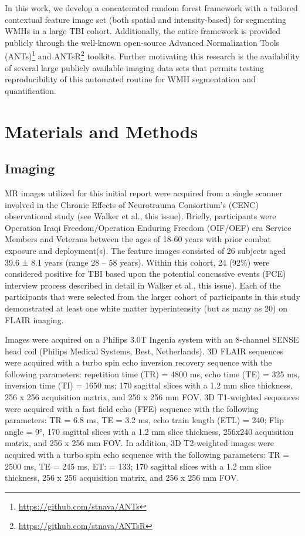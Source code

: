 \documentclass[11pt,]{article}
\let\rmarkdownfootnote\footnote%
\def\footnote{\protect\rmarkdownfootnote}
\begin{document}
In this work, we develop a concatenated random forest framework with a
tailored contextual feature image set (both spatial and intensity-based)
for segmenting WMHs in a large TBI cohort. Additionally, the entire
framework is provided publicly through the well-known open-source
Advanced Normalization Tools (ANTs)\footnote{\url{https://github.com/stnava/ANTs}}
and ANTsR\footnote{\url{https://github.com/stnava/ANTsR}} toolkits.
Further motivating this research is the availability of several large
publicly available imaging data sets that permits testing
reproducibility of this automated routine for WMH segmentation and
quantification.

\section{Materials and Methods}\label{materials-and-methods}

\subsection{Imaging}\label{imaging}

MR images utilized for this initial report were acquired from a single
scanner involved in the Chronic Effects of Neurotrauma Consortium's
(CENC) observational study (see Walker et al., this issue). Briefly,
participants were Operation Iraqi Freedom/Operation Enduring Freedom
(OIF/OEF) era Service Members and Veterans between the ages of 18-60
years with prior combat exposure and deployment(s). The feature images
consisted of 26 subjects aged 39.6 ± 8.1 years (range 28 -- 58 years).
Within this cohort, 24 (92\%) were considered positive for TBI based
upon the potential concussive events (PCE) interview process described
in detail in Walker et al., this issue). Each of the participants that
were selected from the larger cohort of participants in this study
demonstrated at least one white matter hyperintensity (but as many as
20) on FLAIR imaging.

Images were acquired on a Philips 3.0T Ingenia system with an 8-channel
SENSE head coil (Philips Medical Systems, Best, Netherlands). 3D FLAIR
sequences were acquired with a turbo spin echo inversion recovery
sequence with the following parameters: repetition time (TR) = 4800 ms,
echo time (TE) = 325 ms, inversion time (TI) = 1650 ms; 170 sagittal
slices with a 1.2 mm slice thickness, 256 x 256 acquisition matrix, and
256 x 256 mm FOV. 3D T1-weighted sequences were acquired with a fast
field echo (FFE) sequence with the following parameters: TR = 6.8 ms, TE
= 3.2 ms, echo train length (ETL) = 240; Flip angle = 9°, 170 sagittal
slices with a 1.2 mm slice thickness, 256x240 acquisition matrix, and
256 x 256 mm FOV. In addition, 3D T2-weighted images were acquired with
a turbo spin echo sequence with the following parameters: TR = 2500 ms,
TE = 245 ms, ET: = 133; 170 sagittal slices with a 1.2 mm slice
thickness, 256 x 256 acquisition matrix, and 256 x 256 mm FOV.
\end{document}
